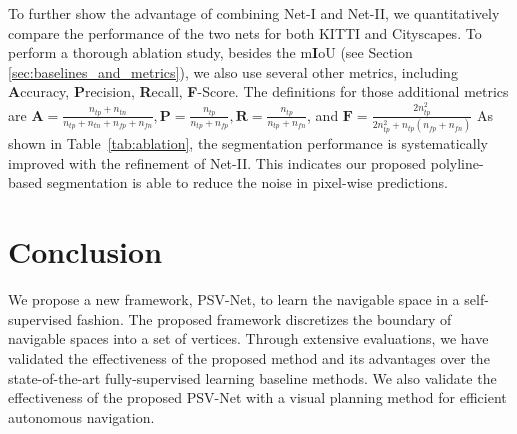 \documentclass[letterpaper, 10 pt, journal, twoside]{ieeetran}
\begin{document}
To further show the advantage of combining Net-I and Net-II, we quantitatively compare the performance of the two nets for both KITTI and Cityscapes. To perform a thorough ablation study, besides the m\textbf{I}oU (see Section \ref{sec:baselines_and_metrics}), we also use several other metrics, including \textbf{A}ccuracy, \textbf{P}recision, \textbf{R}ecall, \textbf{F}-Score. The definitions for those additional metrics are $\mathbf{A} = \frac{n_{tp}+n_{tn}}{n_{tp} + n_{tn} + n_{fp} + n_{fn}}, \mathbf{P} = \frac{n_{tp}}{n_{tp} + n_{fp}}, \mathbf{R} = \frac{n_{tp}}{n_{tp} + n_{fn}}$, and $\mathbf{F} = \frac{2 n_{tp}^2}{2 n_{tp}^2+n_{tp}(n_{fp} + n_{fn})}$ As shown in Table~\ref{tab:ablation}, the segmentation performance is systematically improved with the refinement of  Net-II. This indicates our proposed polyline-based segmentation is able to reduce the noise in pixel-wise predictions.


\section{Conclusion}
We propose a new framework, PSV-Net, to learn the navigable space in a self-supervised fashion. The proposed framework discretizes the boundary of navigable spaces into a set of vertices. Through extensive evaluations, we have validated the effectiveness of the proposed method and its advantages over the state-of-the-art fully-supervised learning baseline methods. We also validate the effectiveness of the proposed PSV-Net with a visual planning method for efficient autonomous navigation.



\end{document}
